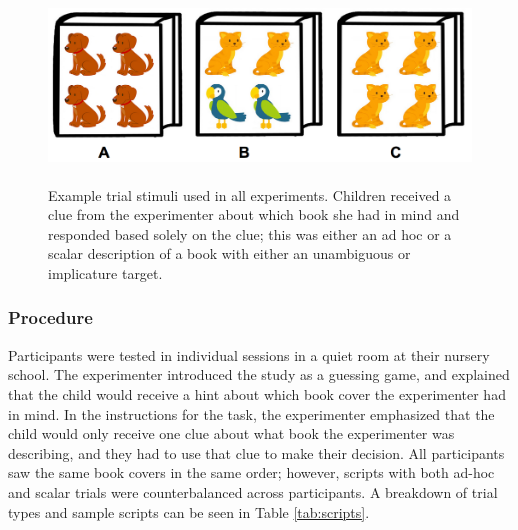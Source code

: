 \documentclass[man]{apa2}
\begin{document}
\begin{figure}
 \begin{center} 
  \includegraphics[height=2in]{figures/implicatures_demo_letters.png} 
  \caption{\label{fig:demo} Example trial stimuli used in all experiments. Children received a clue from the experimenter about which book she had in mind and responded based solely on the clue; this was either an ad hoc or a scalar description of a book with either an unambiguous or implicature target.} 
 \end{center} 
\end{figure}	


\subsubsection{Procedure}
Participants were tested in individual sessions in a quiet room at their nursery school. The experimenter introduced the study as a guessing game, and explained that the child would receive a hint about which book cover the experimenter had in mind. In the instructions for the task, the experimenter emphasized that the child would only receive one clue about what book the experimenter was describing, and they had to use that clue to make their decision. All participants saw the same book covers in the same order; however, scripts with both ad-hoc and scalar trials were counterbalanced across participants. A breakdown of trial types and sample scripts can be seen in Table \ref{tab:scripts}. 
\end{document}
